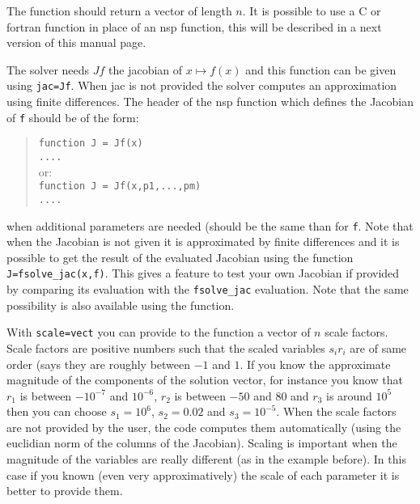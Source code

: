 \begin{mandescription}
The function should return a vector of length $n$. It is possible to use a C or fortran function in place
of an nsp function, this will be described in a next version of this manual page.

The solver needs $Jf$ the jacobian of $x \mapsto f(x)$ and this function can be given using 
\verb+jac=Jf+. When jac is not provided the solver computes an approximation using finite differences. 
The header of the nsp function which defines the Jacobian of \verb+f+ should be of the form:
\begin{quote}
{\tt function J = Jf(x) \\
      ....}\\
or:\\
{\tt function J = Jf(x,p1,...,pm) \\
     ....}
\end{quote}
when additional parameters are needed (should be the same than for {\tt f}.
Note that when the Jacobian is not given it is approximated by finite differences and it is 
possible to get the result of the evaluated Jacobian using the function \verb+J=fsolve_jac(x,f)+.
This gives a feature to test your own Jacobian if provided by comparing its evaluation with the 
\verb+fsolve_jac+ evaluation. Note that the same possibility is also available using the 
 function. 

With \verb+scale=vect+ you can provide to the function a vector of $n$ scale factors.
Scale factors are positive numbers such that the scaled variables $s_i r_i$ are of same order
(says they are roughly between $-1$ and $1$. If you know the approximate magnitude of the components
of the solution vector, for instance you know that $r_1$ is between $-10^{-7}$ and $10^{-6}$, 
$r_2$ is between $-50$ and $80$ and $r_3$ is around  $10^{5}$ then you can choose $s_1 = 10^6$, 
$s_2 = 0.02$ and $s_3 = 10^{-5}$. When the scale factors are not provided by the user, the code 
computes them automatically (using the euclidian norm of the columns of the Jacobian). Scaling is 
important when the magnitude of the variables are really different (as in the example before). In 
this case if you known (even very approximatively) the scale of each parameter it is better
to provide them.  

\end{mandescription} 

